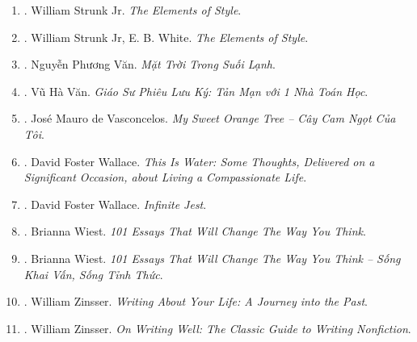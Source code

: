 \documentclass{article}
\begin{document}
\begin{enumerate}
	\item \cite{Strunk_element_style}. William Strunk Jr. {\it The Elements of Style}.\hfill{\sf[done]}
	\item \cite{Strunk_White_element_style}. William Strunk Jr, E. B. White. {\it The Elements of Style}.\hfill{\sf[done]}
	\item \cite{Van_mat_troi_suoi_lanh}. Nguyễn Phương Văn. {\it Mặt Trời Trong Suối Lạnh}.\hfill{\sf[done]}
	\item \cite{VanVu2022}. Vũ Hà Văn. {\it Giáo Sư Phiêu Lưu Ký: Tản Mạn với 1 Nhà Toán Học}.\hfill{\sf[done]}
	\item \cite{Vasconcelos_orange_tree}. Jos\'e Mauro de Vasconcelos. {\it My Sweet Orange Tree -- Cây Cam Ngọt Của Tôi}.\hfill{\sf[done]}
	\item \cite{Wallace_water}. David Foster Wallace. {\it This Is Water: Some Thoughts, Delivered on a Significant Occasion, about Living a Compassionate Life}.\hfill{\sf[done]}
	\item \cite{Wallace_jest}. David Foster Wallace. {\it Infinite Jest}.\hfill{\sf[reading]}
	\item \cite{Wiest_101_essays}. {\sc Brianna Wiest}. {\it 101 Essays That Will Change The Way You Think}.
	\item \cite{Wiest_101_essays_VN}. {\sc Brianna Wiest}. {\it 101 Essays That Will Change The Way You Think -- Sống Khai Vấn, Sống Tỉnh Thức}.\hfill{\sf[done]}
	\item \cite{Zinsser2005}. William Zinsser. {\it Writing About Your Life: A Journey into the Past}.
	\item \cite{Zinsser2016}. William Zinsser. {\it On Writing Well: The Classic Guide to Writing Nonfiction}.\hfill{\sf[reading]}
\end{enumerate}

\end{document}
